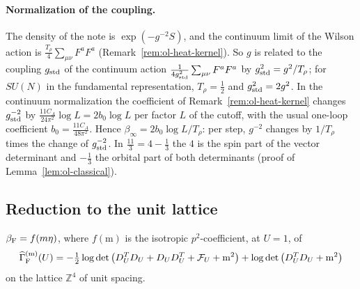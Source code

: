 \paragraph{Normalization of the coupling.} The density of the note is $\exp(-g^{-2}S)$, and the continuum limit of the Wilson action is $\frac{T_\rho}4\sum_{\mu\nu}F^aF^a$ (Remark~\ref{rem:ol-heat-kernel}). So $g$ is related to the coupling $g_{\rm std}$ of the continuum action $\frac1{4g_{\rm std}^2}\sum_{\mu\nu}F^aF^a$ by $g_{\rm std}^2=g^2/T_\rho$; for $SU(N)$ in the fundamental representation, $T_\rho=\frac12$ and $g_{\rm std}^2=2g^2$. In the continuum normalization the coefficient of Remark~\ref{rem:ol-heat-kernel} changes $g_{\rm std}^{-2}$ by $\frac{11C_A}{24\pi^2}\log L=2b_0\log L$ per factor $L$ of the cutoff, with the usual one-loop coefficient $b_0=\frac{11C_A}{48\pi^2}$. Hence $\beta_\infty=2b_0\log L/T_\rho$: per step, $g^{-2}$ changes by $1/T_\rho$ times the change of $g_{\rm std}^{-2}$. In $\frac{11}3=4-\frac13$ the $4$ is the spin part of the vector determinant and $-\frac13$ the orbital part of both determinants (proof of Lemma~\ref{lem:ol-classical}).

\subsection{Reduction to the unit lattice}\label{ss:57.1}

\begin{lemma}[Scaling]\label{lem:ol-scaling}
$\beta_{\rm F}=f(m\eta)$, where $f(\mathrm m)$ is the isotropic $p^2$-coefficient, at $U=1$, of
\[
\widehat\Gamma_{\rm F}^{(\mathrm m)}(U)=-\tfrac12\log\det\big(D_U^TD_U+D_UD_U^T+\mathcal F_U+\mathrm m^2\big)+\log\det\big(D_U^TD_U+\mathrm m^2\big)
\]
on the lattice $\mathbb Z^4$ of unit spacing.
\end{lemma}


